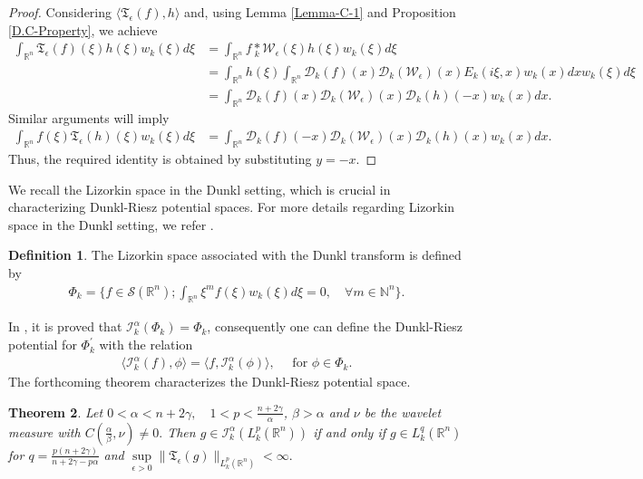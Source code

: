 \documentclass[11pt,a4paper,reqno]{amsproc}
\newtheorem{theorem}{Theorem}[section]
\theoremstyle{definition}
\newtheorem{definition}[theorem]{Definition}
\theoremstyle{remark}
\numberwithin{equation}{section}
\begin{document}
\begin{proof}
 Considering $\langle \mathfrak{T}_{\epsilon}(f), h \rangle$ and, using Lemma \ref{Lemma-C-1} and Proposition \ref{D.C-Property}, we achieve
  \begin{align*}
       \int_{\mathbb{R}^n} \mathfrak{T}_{\epsilon}(f)(\xi)h(\xi)w_k(\xi)d\xi &= \int_{\mathbb{R}^n}  f \underset{k}{\ast}\mathcal{W}_\epsilon(\xi)h(\xi)w_k(\xi)d\xi\\
       &= \int_{\mathbb{R}^n} h(\xi) \int_{\mathbb{R}^n} \mathcal{D}_k(f)(x)\mathcal{D}_k(\mathcal{W}_{\epsilon})(x) E_k(i\xi,x)  w_k(x)dx w_k(\xi)d\xi\\
       &= \int_{\mathbb{R}^n}  \mathcal{D}_k(f)(x)\mathcal{D}_k(\mathcal{W}_{\epsilon})(x) \mathcal{D}_k(h)(-x)w_k(x)dx.
  \end{align*} Similar arguments will imply 
  \begin{align*}
      \int_{\mathbb{R}^n} f(\xi) \mathfrak{T}_{\epsilon}(h)(\xi)w_k(\xi)d\xi &=  \int_{\mathbb{R}^n}  \mathcal{D}_k(f)(-x)\mathcal{D}_k(\mathcal{W}_{\epsilon})(x) \mathcal{D}_k(h)(x)w_k(x)dx.
  \end{align*}Thus, the required identity is obtained by substituting $y=-x$. 
\end{proof}
\noindent We recall the Lizorkin space in the Dunkl setting, which is crucial in characterizing Dunkl-Riesz potential spaces. For more details regarding Lizorkin space in the Dunkl setting, we refer \cite{Gorbachev-2021}.
\begin{definition}
    The Lizorkin space associated with the Dunkl transform is defined by 
    \begin{align*}
        \Phi_k = \{ f\in \mathcal{S}(\mathbb{R}^n); \int_{\mathbb{R}^n} \xi^m f(\xi)w_k(\xi)d\xi =0, \quad \forall m \in \mathbb{N}^n 
        \}. 
    \end{align*}
\end{definition} 
In \cite{Gorbachev-2021}, it is proved that 
$\mathcal{I}_k^\alpha (\Phi_k)=\Phi_k$, consequently one can define the Dunkl-Riesz potential for $\Phi_k^\prime$ with the relation  \begin{align*}
    \langle \mathcal{I}_k^\alpha(f), \phi \rangle = \langle f, \mathcal{I}_k^\alpha(\phi) \rangle , \quad \text{ for } \phi \in \Phi_k. 
\end{align*}
The forthcoming theorem characterizes the Dunkl-Riesz potential space.
\begin{theorem}\label{Char.R.P.Space}
    Let $0<\alpha<n+2\gamma, \quad 1<p<\frac{n+2\gamma}{\alpha}$, $\beta >\alpha $ and $\nu$ be the wavelet measure with $C\left(\frac{\alpha}{\beta},\nu\right)\neq 0.$
    Then $g \in \mathcal{I}_k^\alpha(L_k^p(\mathbb{R}^n))$ if and only if $g \in L_k^q(\mathbb{R}^n)$ for  $q= \frac{p(n+2\gamma)}{n+2\gamma-p\alpha}$ and 
    $\underset{\epsilon>0}{\sup} \| \mathfrak{T}_\epsilon (g)\|_{L_k^p(\mathbb{R}^n)} < \infty.$
\end{theorem}
\end{document}
